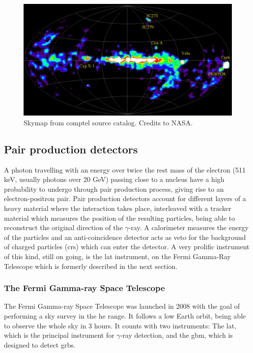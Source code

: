 \documentclass[main.tex]{subfiles}
\begin{document}
\begin{figure}[h]
\centering
 \includegraphics[width=1\textwidth]{Pictures/comptel.pdf}
  \caption{Skymap from \gls{comptel} source catalog. Credits to NASA.}
    \label{fig:comptel}
\end{figure}

\subsection{Pair production detectors} \label{sec:pairprod}

A photon travelling with an energy over twice the rest mass of the electron (511 keV, usually photons over 20 GeV) passing close to a nucleus have a high probability to undergo through pair production process, giving rise to an electron-positron pair.
Pair production detectors account for different layers of a heavy material where the interaction takes place,  interleaved with a tracker material which measures the position of the resulting particles, being able to reconstruct the original direction of the $\gamma$-ray. A calorimeter measures the energy of the particles and an anti-coincidence detector acts as veto for the background of charged particles (\glspl{cr}) which can enter the detector. A very prolific instrument of this kind, still on going, is the \gls{lat} instrument, on the Fermi Gamma-Ray Telescope which is formerly described in the next section.

\subsubsection{The Fermi Gamma-ray Space Telescope} \label{sec:fermi}

The Fermi Gamma-ray Space Telescope was launched in 2008 with the goal of performing a sky survey in the \gls{he} range. It follows a low Earth orbit, being able to observe the whole sky in 3 hours. It counts with two instruments: The \gls{lat}, which is the principal instrument for $\gamma$-ray detection, and the \gls{gbm}, which is designed to detect \glspl{grb}.\\
\end{document}
